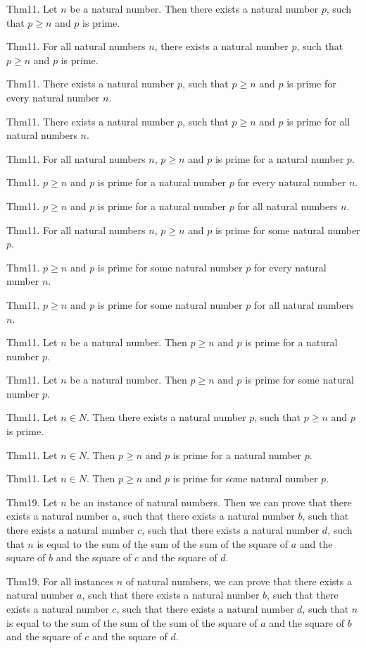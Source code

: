 \documentclass{article}
\begin{document}
Thm11. Let $n$ be a natural number. Then there exists a natural number $p$, such that $p \geq n$ and $p$ is prime.

Thm11. For all natural numbers $n$, there exists a natural number $p$, such that $p \geq n$ and $p$ is prime.

Thm11. There exists a natural number $p$, such that $p \geq n$ and $p$ is prime for every natural number $n$.

Thm11. There exists a natural number $p$, such that $p \geq n$ and $p$ is prime for all natural numbers $n$.

Thm11. For all natural numbers $n$, $p \geq n$ and $p$ is prime for a natural number $p$.

Thm11. $p \geq n$ and $p$ is prime for a natural number $p$ for every natural number $n$.

Thm11. $p \geq n$ and $p$ is prime for a natural number $p$ for all natural numbers $n$.

Thm11. For all natural numbers $n$, $p \geq n$ and $p$ is prime for some natural number $p$.

Thm11. $p \geq n$ and $p$ is prime for some natural number $p$ for every natural number $n$.

Thm11. $p \geq n$ and $p$ is prime for some natural number $p$ for all natural numbers $n$.

Thm11. Let $n$ be a natural number. Then $p \geq n$ and $p$ is prime for a natural number $p$.

Thm11. Let $n$ be a natural number. Then $p \geq n$ and $p$ is prime for some natural number $p$.

Thm11. Let $n \in N$. Then there exists a natural number $p$, such that $p \geq n$ and $p$ is prime.

Thm11. Let $n \in N$. Then $p \geq n$ and $p$ is prime for a natural number $p$.

Thm11. Let $n \in N$. Then $p \geq n$ and $p$ is prime for some natural number $p$.

Thm19. Let $n$ be an instance of natural numbers. Then we can prove that there exists a natural number $a$, such that there exists a natural number $b$, such that there exists a natural number $c$, such that there exists a natural number $d$, such that $n$ is equal to the sum of the sum of the sum of the square of $a$ and the square of $b$ and the square of $c$ and the square of $d$.

Thm19. For all instances $n$ of natural numbers, we can prove that there exists a natural number $a$, such that there exists a natural number $b$, such that there exists a natural number $c$, such that there exists a natural number $d$, such that $n$ is equal to the sum of the sum of the sum of the square of $a$ and the square of $b$ and the square of $c$ and the square of $d$.
\end{document}
